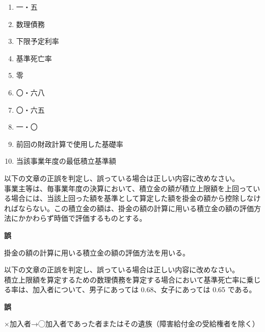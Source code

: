 \begin{answerbox}
  \begin{enumerate}[A: ]
    \item 一・五
    \item 数理債務
    \item 下限予定利率
    \item 基準死亡率
    \item 零
    \item 〇・六八
    \item 〇・六五
    \item 一・〇
    \item 前回の財政計算で使用した基礎率
    \item 当該事業年度の最低積立基準額
  \end{enumerate}
\end{answerbox}




\begin{truefalse}[年金2 2025 問題1(1)ア\ajRoman{3}]
  以下の文章の正誤を判定し、誤っている場合は正しい内容に改めなさい。
  \\

  事業主等は、毎事業年度の決算において、積立金の額が積立上限額を上回ってい
  る場合には、当該上回った額を基準として算定した額を掛金の額から控除しなけ
  ればならない。この積立金の額は、掛金の額の計算に用いる積立金の額の評価方
  法にかかわらず時価で評価するものとする。
\end{truefalse}

\begin{answerbox}
  \textbf{誤}

  掛金の額の計算に用いる積立金の額の評価方法を用いる。
\end{answerbox}

\begin{truefalse}[年金2 2025 問題1(1)ウ\ajRoman{3}]
    以下の文章の正誤を判定し、誤っている場合は正しい内容に改めなさい。
  \\

  積立上限額を算定するための数理債務を算定する場合において基準死亡率に乗じ
  る率は、加入者について、男子にあっては 0.68、女子にあっては 0.65 である。
\end{truefalse}

\begin{answerbox}
  \textbf{誤}

  ×加入者→◯加入者であった者またはその遺族（障害給付金の受給権者を除く）
\end{answerbox}

